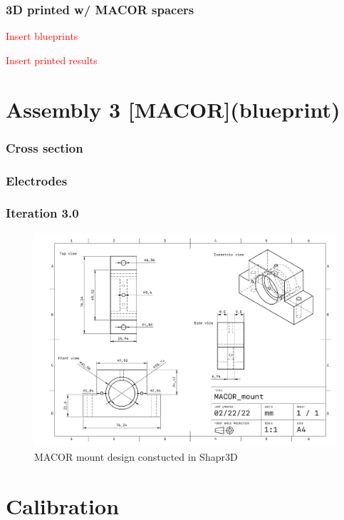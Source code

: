 \subsubsection{3D printed w/ MACOR spacers}

\textcolor{red}{Insert blueprints}

\textcolor{red}{Insert printed results}

\newpage

\section{Assembly 3 [MACOR](blueprint)}
\subsubsection{Cross section}
\subsubsection{Electrodes}

\subsubsection{Iteration 3.0}
\begin{figure}[H]
\includegraphics[width=\textwidth]{figs/ALGAAS/assemblies/assembly3/MACOR_mount.pdf}
\caption{MACOR mount design constucted in Shapr3D}
\label{fig:macor_mount_design}
\end{figure}

\mbox{}
\vfill

\section{Calibration}\label{sec:calibration}




